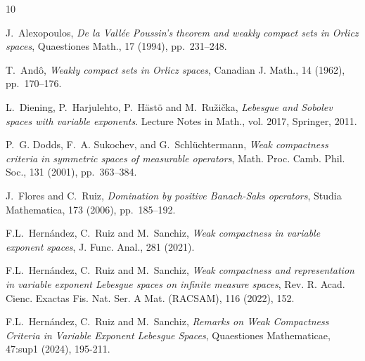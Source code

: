 \documentclass[11pt,a4paper]{amsart}
\begin{document}
\begin{thebibliography}{10}


{\sc J.~Alexopoulos}, {\em De la {V}allée {P}oussin's theorem and weakly compact sets in {O}rlicz spaces}, Quaestiones Math., 17 (1994), pp.~231--248.

{\sc T.~And\^{o}}, {\em Weakly compact sets in {O}rlicz spaces}, Canadian J.
  Math., 14 (1962), pp.~170--176.

{\sc L.~Diening, P.~Harjulehto, P.~H\"{a}st\"{o} and M.~Ru\v{z}i\v{c}ka}, {\em
  Lebesgue and {S}obolev spaces with variable exponents}.
\newblock Lecture Notes in Math., vol. 2017, Springer, 2011.


{\sc P.~G. Dodds, F.~A. Sukochev, and G.~Schl\"{u}chtermann}, {\em Weak
  compactness criteria in symmetric spaces of measurable operators}, Math.
  Proc. Camb. Phil. Soc., 131 (2001), pp.~363--384.



{\sc J.~Flores and C.~Ruiz}, {\em Domination by positive {B}anach-{S}aks
  operators}, Studia Mathematica, 173 (2006), pp.~185--192.



{\sc F.L.~Hern\'{a}ndez, C.~Ruiz and M.~Sanchiz}, {\em Weak compactness in variable exponent spaces}, J. Func. Anal., 281 (2021).

{\sc F.L.~Hern\'{a}ndez, C.~Ruiz and M.~Sanchiz}, {\em Weak compactness and representation in variable exponent Lebesgue spaces on infinite measure spaces}, Rev. R. Acad. Cienc. Exactas Fis. Nat. Ser. A Mat. (RACSAM), 116 (2022), 152.

{\sc F.L.~Hern\'{a}ndez, C.~Ruiz and M.~Sanchiz}, {\em Remarks on Weak Compactness Criteria in Variable Exponent Lebesgue Spaces}, Quaestiones Mathematicae, 47:sup1 (2024), 195-211. %


\end{thebibliography}
\end{document}
